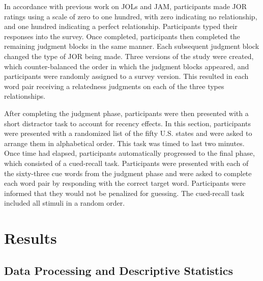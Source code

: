 \documentclass[english,,man]{apa6}
\begin{document}
In accordance with previous work on JOLs and JAM, participants made JOR ratings using a scale of zero to one hundred, with zero indicating no relationship, and one hundred indicating a perfect relationship. Participants typed their responses into the survey. Once completed, participants then completed the remaining judgment blocks in the same manner. Each subsequent judgment block changed the type of JOR being made. Three versions of the study were created, which counter-balanced the order in which the judgment blocks appeared, and participants were randomly assigned to a survey version. This resulted in each word pair receiving a relatedness judgments on each of the three types relationships.

After completing the judgment phase, participants were then presented with a short distractor task to account for recency effects. In this section, participants were presented with a randomized list of the fifty U.S. states and were asked to arrange them in alphabetical order. This task was timed to last two minutes. Once time had elapsed, participants automatically progressed to the final phase, which consisted of a cued-recall task. Participants were presented with each of the sixty-three cue words from the judgment phase and were asked to complete each word pair by responding with the correct target word. Participants were informed that they would not be penalized for guessing. The cued-recall task included all stimuli in a random order.

\hypertarget{results}{%
\section{Results}\label{results}}

\hypertarget{data-processing-and-descriptive-statistics}{%
\subsection{Data Processing and Descriptive Statistics}\label{data-processing-and-descriptive-statistics}}
\end{document}
